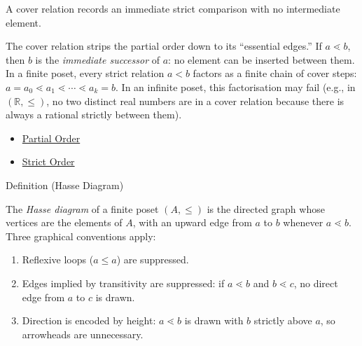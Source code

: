 \begin{remark*}[Interpretation]
A cover relation records an immediate strict comparison with no intermediate
element.
\end{remark*}

\begin{remark*}[Exposition]
The cover relation strips the partial order down to its ``essential edges.''
If $a \lessdot b$, then $b$ is the \emph{immediate successor} of $a$: no
element can be inserted between them.  In a finite poset, every strict
relation $a < b$ factors as a finite chain of cover steps:
$a = a_0 \lessdot a_1 \lessdot \cdots \lessdot a_k = b$.  In an infinite
poset, this factorisation may fail (e.g., in $(\mathbb{R}, \leq)$, no two
distinct real numbers are in a cover relation because there is always a
rational strictly between them).
\end{remark*}

\begin{dependencies}
\begin{itemize}
  \item \hyperref[def:partial-order]{Partial Order}
  \item \hyperref[def:strict-order]{Strict Order}
\end{itemize}
\end{dependencies}


\begin{definitionbox}{Definition (Hasse Diagram)}
\begin{definition}\label{def:hasse}
The \emph{Hasse diagram} of a finite poset $(A, \leq)$ is the directed graph
whose vertices are the elements of $A$, with an upward edge from $a$ to $b$
whenever $a \lessdot b$.  Three graphical conventions apply:
\begin{enumerate}[label=(\roman*)]
  \item Reflexive loops ($a \leq a$) are suppressed.
  \item Edges implied by transitivity are suppressed: if $a \lessdot b$ and
        $b \lessdot c$, no direct edge from $a$ to $c$ is drawn.
  \item Direction is encoded by height: $a \lessdot b$ is drawn with $b$
        strictly above $a$, so arrowheads are unnecessary.
\end{enumerate}
\end{definition}
\end{definitionbox}

